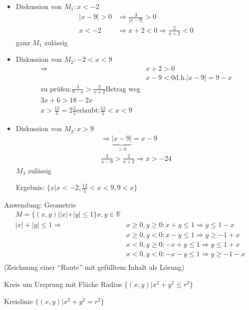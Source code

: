 \begin{itemize}
 \item Diskussion von $M_1: x < -2$
\begin{align*}
|x-9|>0 &\Rightarrow \frac{3}{|x-9|} > 0 \\
x<-2 &\Rightarrow x+2<0 \Rightarrow \frac{2}{x+2}<0
\end{align*}
ganz $M_1$ zulässig
 \item Diskussion von $M_2: -2<x<9$
\begin{align*}
\Rightarrow &x+2 > 0 \\
&x-9<0 \textrm{d.h.} |x-9|=9-x \\
\textrm{zu prüfen:}
\frac{3}{9-x} > \frac{2}{x+2} \textrm{Betrag weg} \\
3x+6 > 18-2x \\
x > \frac{12}{5} = 2 \frac{2}{5}
\textrm{erlaubt:} \frac{12}{5}<x<9
\end{align*}
 \item Diskussion von $M_3: x>9$
\begin{align*}
 \Rightarrow \underbrace{|x-9|}_{>0} = x-9 \\
\frac{3}{x-9} > \frac{2}{x+2}
\Rightarrow x>-24
\end{align*}
$M_3$ zulässig

Ergebnis: $\{x|x<-2, \frac{12}{5}<x<9, 9<x\}$
\end{itemize}

Anwendung: Geometrie
\begin{align*}
M = \{(x,y)| |x|+|y| \leq 1 \} x,y \in \mathbb{R} \\
|x|+|y| \leq 1 \Rightarrow &x \geq 0, y \geq 0: x+y \leq 1 \Rightarrow y \leq 1-x \\
	&x \geq 0, y < 0: x-y \leq 1 \Rightarrow y \geq -1+x \\
	&x < 0, y \geq 0: -x+y \leq 1 \Rightarrow y \leq 1+x \\
	&x < 0, y < 0: -x-y \leq 1 \Rightarrow y \geq -1-x \\
\end{align*}
(Zeichnung einer ``Raute'' mit gefülltem Inhalt als Lösung)


Kreis um Ursprung mit Fläche
Radius $\{(x,y)| x^2+y^2\leq r^2 \}$

Kreislinie $\{(x,y)| x^2+y^2 = r^2 \}$

